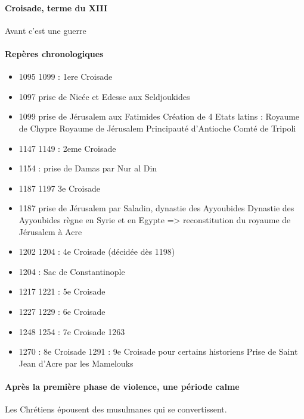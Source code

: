 \paragraph{Croisade, terme du XIII} Avant c'est une guerre

\paragraph{Repères chronologiques}
\begin{itemize}

    \item   1095
1099 : 1ere Croisade
    \item   1097
prise de Nicée et Edesse aux Seldjoukides
    \item   1099
prise de Jérusalem aux Fatimides
Création
de 4 Etats latins :
Royaume de Chypre
Royaume de Jérusalem
Principauté d’Antioche
Comté de Tripoli
    \item   
1147
1149 : 2eme Croisade
    \item  1154 : prise de Damas par Nur
al Din
    \item  1187
1197 3e Croisade
    \item  1187
prise de Jérusalem par Saladin, dynastie des Ayyoubides
Dynastie
des Ayyoubides règne en Syrie et en Egypte
=>
reconstitution du royaume de Jérusalem à Acre
    \item  1202
1204 : 4e Croisade (décidée dès 1198)
   \item  1204 : Sac de Constantinople
\item 1217
1221 : 5e Croisade
    \item  1227
1229 : 6e Croisade
    \item  1248
1254 : 7e Croisade
1263
    \item  1270 : 8e Croisade
1291 : 9e Croisade pour certains historiens
Prise de
Saint Jean d’Acre par les Mamelouks
\end{itemize}


\paragraph{Après la première phase de violence, une période calme} Les Chrétiens épousent des musulmanes qui se convertissent.
